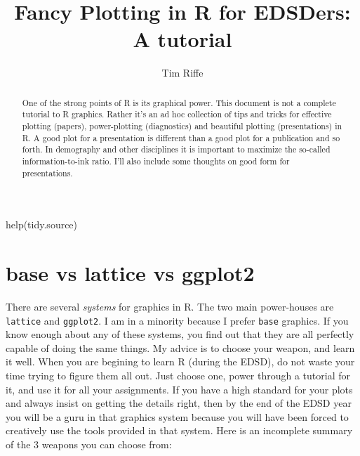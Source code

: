 \documentclass[a4paper]{article}
\begin{document}
\title{Fancy Plotting in R for EDSDers: A tutorial}
\author{Tim Riffe}

\maketitle

\begin{abstract}
One of the strong points of R is its graphical power. This document is not a complete tutorial to R graphics. Rather it's an ad hoc collection of tips and tricks for effective plotting (papers), power-plotting (diagnostics) and beautiful plotting (presentations) in R. A good plot for a presentation is different than a good plot for a publication and so forth. In demography and other disciplines it is important to maximize the so-called information-to-ink ratio. I'll also include some thoughts on good form for presentations.
\end{abstract}
help(tidy.source)
\pagebreak
\section{base vs lattice vs ggplot2}
There are several \textit{systems} for graphics in R. The two main power-houses are \texttt{lattice} and \texttt{ggplot2}. I am in a minority because I prefer \texttt{base} graphics. If you know enough about any of these systems, you find out that they are all perfectly capable of doing the same things. My advice is to choose your weapon, and learn it well. When you are begining to learn R (during the EDSD), do not waste your time trying to figure them all out. Just choose one,  power through a tutorial for it, and use it for all your assignments. If you have a high standard for your plots and always insist on getting the details right, then by the end of the EDSD year you will be a guru in that graphics system because you will have been forced to creatively use the tools provided in that system. Here is an incomplete summary of the 3 weapons you can choose from:
\end{document}
